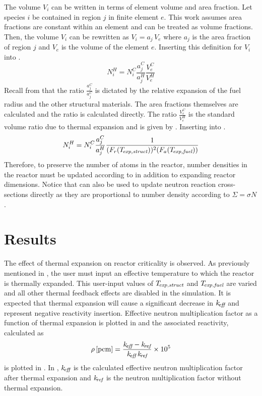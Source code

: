     The volume $V_i$ can be written in terms of element volume and area
    fraction. Let species $i$ be contained in region $j$ in finite element $e$. 
    This work assumes area fractions are constant within an element and can be
    treated as volume fractions. Then, the volume $V_i$ can be rewritten as 
    $V_i = a_j \, V_e$ where $a_j$ is the area fraction of region $j$ and $V_e$
    is the volume of the element $e$. Inserting this definition for $V_i$ into
    .
    \begin{equation}
      \label{eq:nden_expansion_expanded}
      N_i^H = N_i^C \frac{a_j^C}{a_j^H} \frac{V_e^C}{V_e^H}
    \end{equation}
    Recall from  that the
    ratio $\frac{a_j^C}{a_j^C}$ is dictated by the relative expansion of the
    fuel radius and the other structural materials. The area fractions
    themselves are calculated and the ratio is calculated directly. The 
    ratio $\frac{V_e^C}{V_e^H}$ is the standard volume ratio due to thermal 
    expansion and is given by . Inserting 
     into .
    \begin{equation}
      \label{eq:nden_thexp_update}
      N_i^H = N_i^C \frac{a_j^C}{a_j^H} 
        \frac{1}{(F_r(T_{\!\mbox{\scriptsize \em exp,struct}}))^2 (F_a({T_{\!\mbox{\scriptsize \em exp,fuel}}}))}
    \end{equation}
    Therefore, to preserve the number of atoms in the reactor, number densities
    in the reactor must be updated according to  in
    addition to expanding reactor dimensions. Notice that
     can also be used to update neutron reaction 
    cross-sections directly as they are proportional to number density according
    to $\Sigma = \sigma N$.

\section{Results}
  The effect of thermal expansion on reactor criticality is observed. As
  previously mentioned in , 
  the user must input an effective temperature to which the reactor is thermally 
  expanded. This user-input values of $T_{\!\mbox{\scriptsize \em exp,struct}}$ and ${T_{\!\mbox{\scriptsize \em exp,fuel}}}$ are varied 
  and all other thermal feedback effects are disabled in the simulation. It is 
  expected that thermal expansion will cause a significant decrease in $k_{\!\mbox{\scriptsize \em eff}}$ 
  and represent negative reactivity insertion. Effective neutron multiplication 
  factor as a function of thermal expansion is plotted in  
  and the associated reactivity, calculated as
  \begin{equation}
    \label{eq:reactivity_formula}
    \rho \left[\text{{pcm}}\right] = \frac{k_{\!\mbox{\scriptsize \em eff}} - k_{\!\mbox{\scriptsize \em ref}}}{k_{\!\mbox{\scriptsize \em eff}} \, k_{\!\mbox{\scriptsize \em ref}}} \times 10^5
  \end{equation}
  is plotted in . In
  , $k_{\!\mbox{\scriptsize \em eff}}$ is the calculated effective neutron 
  multiplication factor after thermal expansion and $k_{\!\mbox{\scriptsize \em ref}}$ is the neutron 
  multiplication factor without thermal expansion. 

